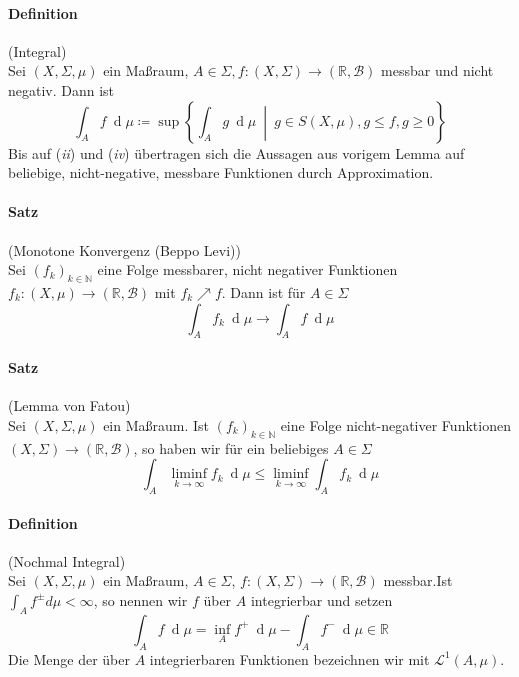 \documentclass[12pt,a4paper,fleqn]{article}
\def\set#1{{\left\{ #1 \right\}}}
\def\Mid{\ \middle|\ }
\def\d{{\operatorname{d}}}
\begin{document}
\paragraph{Definition} (Integral)\\
Sei $(X, \Sigma, \mu)$ ein Maßraum, $A \in \Sigma, f\colon (X, \Sigma) \rightarrow (\mathbb{R}, \mathcal{B})$ messbar und nicht negativ. Dann ist 
\begin{displaymath}
\int_A f\ \d\mu \coloneqq \sup \set{\int_A g\ \d\mu \Mid g \in S(X, \mu), g \leq f, g \geq 0 }
\end{displaymath}
Bis auf (\textit{ii}) und (\textit{iv}) übertragen sich die Aussagen aus vorigem Lemma auf beliebige, nicht-negative, messbare Funktionen durch Approximation.

\paragraph{Satz} (Monotone Konvergenz (Beppo Levi))\\
Sei $(f_k)_{k \in \mathbb{N}}$ eine Folge messbarer, nicht negativer Funktionen $f_k: (X, \mu) \rightarrow (\mathbb{R}, \mathcal{B})$ mit $f_k \nearrow f$. Dann ist für $A \in \Sigma$
\begin{displaymath}
\int_A f_k\ \d\mu \rightarrow \int_A f\ \d\mu 
\end{displaymath}

\paragraph{Satz} (Lemma von Fatou)\\
Sei $(X, \Sigma, \mu)$ ein Maßraum. Ist $(f_k)_{k \in \mathbb{N}}$ eine Folge nicht-negativer Funktionen\linebreak ${(X, \Sigma) \rightarrow (\mathbb{R}, \mathcal{B})}$, so haben wir für ein beliebiges $A \in \Sigma$
\begin{displaymath}
\int_A \liminf_{k \rightarrow \infty} f_k\ \d\mu \leq \liminf_{k \rightarrow \infty} \int_A f_k\ \d\mu 
\end{displaymath}

\paragraph{Definition} (Nochmal Integral)\\
Sei $(X, \Sigma, \mu)$ ein Maßraum,  $A \in \Sigma$, $f\colon(X, \Sigma) \rightarrow (\mathbb{R}, \mathcal{B})$ messbar.Ist $\int_A f^\pm d\mu < \infty$, so nennen wir $f$ über $A$ integrierbar und setzen
\begin{displaymath}
\int_A f\ \d\mu = \inf_A f^+\ \d\mu - \int_A f^-\ \d\mu \in \mathbb{R}
\end{displaymath}
Die Menge der über $A$ integrierbaren Funktionen bezeichnen wir mit $\mathscr{L}^1(A, \mu)$.
\end{document}
